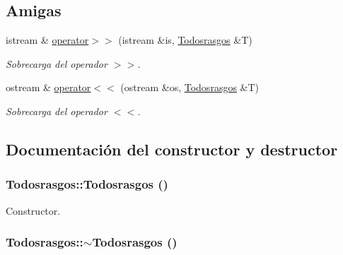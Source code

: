 \subsection*{Amigas}
\begin{CompactItemize}
\item 
istream \& \hyperlink{class_todosrasgos_b10d8e2982f53857984555835f8b0c39}{operator$>$$>$} (istream \&is, \hyperlink{class_todosrasgos}{Todosrasgos} \&T)
\begin{CompactList}\small\item\em Sobrecarga del operador $>$$>$. \item\end{CompactList}\item 
ostream \& \hyperlink{class_todosrasgos_f668c78e104d9dd9ae3a3639709227b9}{operator$<$$<$} (ostream \&os, \hyperlink{class_todosrasgos}{Todosrasgos} \&T)
\begin{CompactList}\small\item\em Sobrecarga del operador $<$$<$. \item\end{CompactList}\end{CompactItemize}


\subsection{Documentación del constructor y destructor}
\hypertarget{class_todosrasgos_8a31d936c54899e99dd9ab44a4a194c7}{
\subsubsection[{Todosrasgos}]{\setlength{\rightskip}{0pt plus 5cm}Todosrasgos::Todosrasgos ()}}
\label{class_todosrasgos_8a31d936c54899e99dd9ab44a4a194c7}


Constructor. 

\hypertarget{class_todosrasgos_07a2e654d9fe7d9de9b0a3bb496d4245}{
\subsubsection[{$\sim$Todosrasgos}]{\setlength{\rightskip}{0pt plus 5cm}Todosrasgos::$\sim$Todosrasgos ()}}
\label{class_todosrasgos_07a2e654d9fe7d9de9b0a3bb496d4245}


